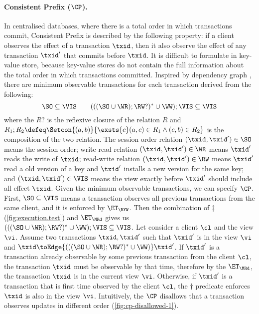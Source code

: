 \paragraph{Consistent Prefix ($\CP$).}
In centralised databases, where there is a total order in which transactions commit, 
Consistent Prefix is described by the following property: 
if a client observes the effect of a transaction $\txid$,
then it also observe the effect of any transaction $\txid'$ that commits before $\txid$.
It is difficult to formulate in key-value store,
because key-value stores do not contain the full information about the total order in which transactions committed. 
Inspired by dependency graph \cite{.....},
there are minimum observable transactions for each transaction derived from the following:
\[
    \SO  \subseteq  \VIS \qquad
    ( ( ( \SO \cup \WR ) ; \RW? )^* \cup \WW ) ; \VIS \subseteq \VIS
\]
where the \( R? \) is the reflexive closure of the relation \( R \) 
and \( R_1 ; R_2 \defeq \Setcon{(a,b)}{\exsts{c} (a,c) \in R_1 \land (c,b) \in R_2 } \) is the composition of the two relation.
The session order relation \( (\txid, \txid') \in \SO \) means the session order;
write-read relation \( (\txid, \txid') \in \WR \) means \( \txid' \) reads the write of \( \txid \);
read-write relation \( (\txid, \txid') \in \RW \) means \( \txid' \) read a old version of a key 
and \( \txid' \) installs a new version for the same key;
and \( (\txid, \txid') \in \VIS \) means the view exactly before \( \txid' \) should include all effect \( \txid \).
Given the minimum observable transactions, we can specify $\CP$. 
First, \( \SO \subseteq \VIS \) means a transaction observes all previous transactions from the same client,
and it is enforced by \( \ET_\RYW \).
Then the combination of \( \ddagger\) (\cref{fig:execution.test}) and \( \ET_\MRd \) gives us \( ( ( ( \SO \cup \WR ) ; \RW? )^* \cup \WW ) ; \VIS \subseteq \VIS \).
Let consider a client \( \cl \) and the view \( \vi \).
Assume two transactions \( \txid, \txid' \)  such that \( \txid' \) is in the view \( \vi \) and \( \txid \toEdge{( ( ( \SO \cup \WR ) ; \RW? )^* \cup \WW )} \txid' \).
If \( \txid' \) is a transaction already observable by some previous transaction from the client \( \cl \), 
the transaction \( \txid \) must be observable by that time,
therefore by the \( \ET_\MRd \), the transaction \( \txid \) is in the current view \( \vi \).
Otherwise, if \( \txid' \) is a transaction that is first time observed by the client \( \cl \),
the \( \dagger \) predicate enforces \( \txid \) is also in the view \( \vi \).
Intuitively, the \( \CP \) disallows that a transaction observes updates in different order (\cref{fig:cp-disallowed-1}).
